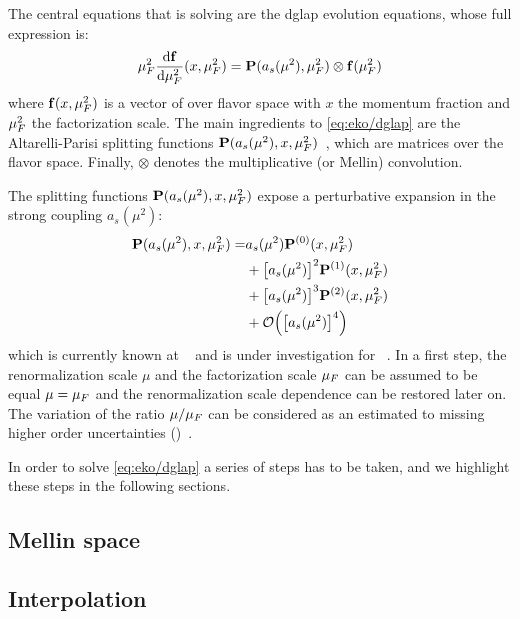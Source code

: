 
The central equations that \eko is solving are the \acrfull{dglap} evolution
equations, whose full expression is:
\begin{equation}
	\muF^2 \dv{\vb f}{\muF^2}{}(x,\muF^2) = \vb P (a_s(\mu^2),\muF^2) \otimes \vb f(\muF^2)
	\label{eq:eko/dglap}
\end{equation}
where $\vb f(x,\mu_F^2)$ is a vector of \pdfs over flavor space with $x$ the
momentum fraction and $\mu_F^2$ the factorization scale.
The main ingredients to \cref{eq:eko/dglap} are the Altarelli-Parisi splitting
functions $\vb P(a_s(\mu^2),x,\mu_F^2)$~\cite{Moch:2004pa,Vogt:2004mw}, which
are matrices over the flavor space.
Finally, $\otimes$ denotes the multiplicative (or Mellin) convolution.

The splitting functions $\vb P(a_s(\mu^2),x,\mu_F^2)$ expose a perturbative
expansion in the strong coupling $a_s(\mu^2)$:
\begin{align}
  \vb P(a_s(\mu^2),x,\muF^2) =& a_s(\mu^2) \vb P^{(0)}(x,\muF^2)\nonumber\\
  &+ \qty[a_s(\mu^2)]^2 \vb P^{(1)}(x,\muF^2)\nonumber\\
  &+ \qty[a_s(\mu^2)]^3 \vb P^{(2)}(x,\muF^2)\nonumber\\
  &+ \order{\qty[a_s(\mu^2)]^4}
\end{align}
which is currently known at \nnlo{}~\cite{Moch:2004pa,Vogt:2004mw,Blumlein:2021enk} and is under
investigation for \nnnlo{}~\cite{Moch:2021qrk}.
In a first step, the renormalization scale $\mu$ and the factorization scale
$\mu_F$ can be assumed to be equal $\mu = \mu_F$ and the renormalization scale
dependence can be restored later on. The variation of the ratio $\mu/\mu_F$ can
be considered as an estimated to missing higher order
uncertainties (\mhou{})~\cite{AbdulKhalek:2019ihb}.

In order to solve \cref{eq:eko/dglap} a series of steps has to be taken, and we
highlight these steps in the following sections.

\subsection{Mellin space}
\label{sec:theory:mellin}


\subsection{Interpolation}
\label{sec:theory:interpolation}


